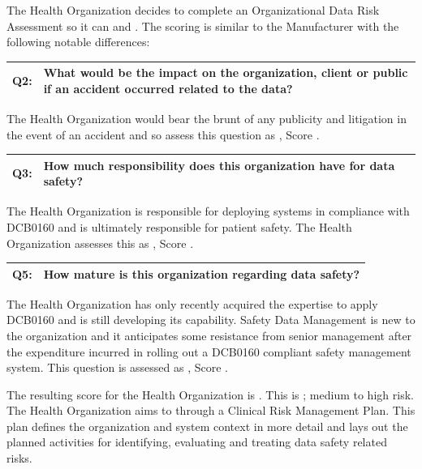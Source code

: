The Health Organization decides to complete an Organizational Data Risk
Assessment
so it can  and . The scoring is similar to the Manufacturer with the following notable differences:

\begin{longtable*}[H]
  {|L{}|L{}|}
  \hline
  Q2: & What would be the impact on the organization, client or public if an accident occurred related to the data?\\
  \hline
\end{longtable*}

The Health Organization would bear the brunt of any publicity and litigation in the event of an accident and so assess this question as , Score .

\begin{longtable*}[H]
  {|L{}|L{}|}
  \hline
  Q3: & How much responsibility does this organization have for data safety?\\
  \hline
\end{longtable*}

The Health Organization is responsible for deploying systems in compliance with
DCB0160 \cite{citation:dcb0160clinical}
and is ultimately responsible for patient safety. The Health Organization assesses this as , Score .

\begin{longtable*}[H]
  {|L{}|L{}|}
  \hline
  Q5: & How mature is this organization regarding data safety?\\
  \hline
\end{longtable*}

The Health Organization has only recently acquired the expertise to apply
DCB0160
and is still developing its capability. Safety Data Management is new to the organization and it anticipates some resistance from senior management after the expenditure incurred in rolling out a
DCB0160
compliant safety management system. This question is assessed as , Score .

The resulting score for the Health Organization is . This is ; medium to high risk.
The Health Organization aims to  through a Clinical Risk Management Plan. This plan defines the organization and system context in more detail and lays out the planned activities for identifying, evaluating and treating data safety related risks.

